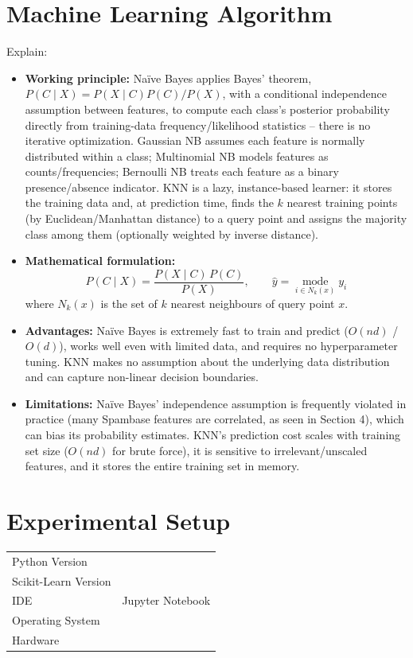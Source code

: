 \documentclass[12pt,a4paper]{article}
\begin{document}
\section{Machine Learning Algorithm}
Explain:
\begin{itemize}
\item \textbf{Working principle:} Na\"ive Bayes applies Bayes' theorem,
$P(C\mid X) = P(X\mid C)P(C)/P(X)$, with a conditional independence assumption between
features, to compute each class's posterior probability directly from training-data
frequency/likelihood statistics -- there is no iterative optimization. Gaussian NB assumes
each feature is normally distributed within a class; Multinomial NB models features as
counts/frequencies; Bernoulli NB treats each feature as a binary presence/absence indicator.
KNN is a lazy, instance-based learner: it stores the training data and, at prediction time,
finds the $k$ nearest training points (by Euclidean/Manhattan distance) to a query point and
assigns the majority class among them (optionally weighted by inverse distance).
\item \textbf{Mathematical formulation:}
$$P(C\mid X) = \frac{P(X\mid C)\,P(C)}{P(X)}, \qquad
\hat{y} = \operatorname*{mode}_{i \in N_k(x)} y_i$$
where $N_k(x)$ is the set of $k$ nearest neighbours of query point $x$.
\item \textbf{Advantages:} Na\"ive Bayes is extremely fast to train and predict
($O(nd)$ / $O(d)$), works well even with limited data, and requires no hyperparameter tuning.
KNN makes no assumption about the underlying data distribution and can capture non-linear
decision boundaries.
\item \textbf{Limitations:} Na\"ive Bayes' independence assumption is frequently violated in
practice (many Spambase features are correlated, as seen in Section 4), which can bias its
probability estimates. KNN's prediction cost scales with training set size ($O(nd)$ for brute
force), it is sensitive to irrelevant/unscaled features, and it stores the entire training
set in memory.
\end{itemize}

\section{Experimental Setup}
\begin{tabular}{ll}
\toprule
Python Version & \\
Scikit-Learn Version & \\
IDE & Jupyter Notebook \\
Operating System & \\
Hardware & \\
\bottomrule
\end{tabular}
\end{document}
